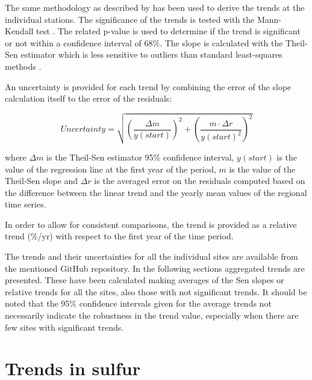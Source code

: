 The same methodology as described by \cite{aas2019global, mortier2020} has been used to derive the trends at the individual stations. The significance of the trends is tested with the Mann-Kendall test \citep{hamed1998modified}. The related p-value is used to determine if the trend is significant or not within a confidence interval of 68\%. The slope is calculated with the Theil-Sen estimator which is less sensitive to outliers than standard least-squares methods \citep{sen1968estimates}.

An uncertainty is provided for each trend by combining the error of the slope calculation itself to the error of the residuals:

\begin{equation}
 Uncertainty = \sqrt{{\left (\frac{\Delta m}{y(start)}\right )}^{2} + {\left ( \frac{m \cdot \Delta r}{y(start)^2}\right )}^{2} }
\end{equation}

where $\Delta m$ is the Theil-Sen estimator 95\% confidence interval, $y(start)$ is the value of the regression line at the first year of the period, $m$ is the value of the Theil-Sen slope and $\Delta r$ is the averaged error on the residuals computed based on the difference between the linear trend and the yearly mean values of the regional time series.

In order to allow for consistent comparisons, the trend is provided as a relative trend (\%/yr) with respect to the first year of the time period.

The trends and their uncertainties for all the individual sites are available from the mentioned GitHub repository. In the following sections aggregated trends are presented. These have been calculated making averages of the Sen slopes or relative trends for all the sites, also those with not significant trends. It should be noted that the 95\% confidence intervals given for the average trends not necessarily indicate the robustness in the trend value, especially when there are few sites with significant trends.


\section{\label{sec:Trends_sulfur}Trends in sulfur}

